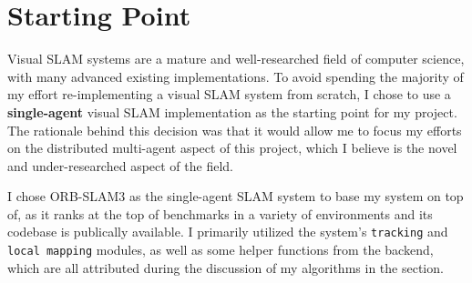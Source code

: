 




\label{sec:2}

\section{Starting Point}
\label{sec:starting-point}
Visual SLAM systems are a mature and well-researched field of computer science, with many advanced existing implementations. To avoid spending the majority of my effort re-implementing a visual SLAM system from scratch, I chose to use a \textbf{single-agent} visual SLAM implementation as the starting point for my project. The rationale behind this decision was that it would allow me to focus my efforts on the distributed multi-agent aspect of this project, which I believe is the novel and under-researched aspect of the field.

I chose ORB-SLAM3 \autocite{ORBSLAM3_TRO} as the single-agent SLAM system to base my system on top of, as it ranks at the top of benchmarks in a variety of environments \autocite{DBLP:journals/corr/abs-2108-01654} and its codebase is publically available. I primarily utilized the system's \texttt{tracking} and \texttt{local mapping} modules, as well as some helper functions from the backend, which are all attributed during the discussion of my algorithms in the  section.

